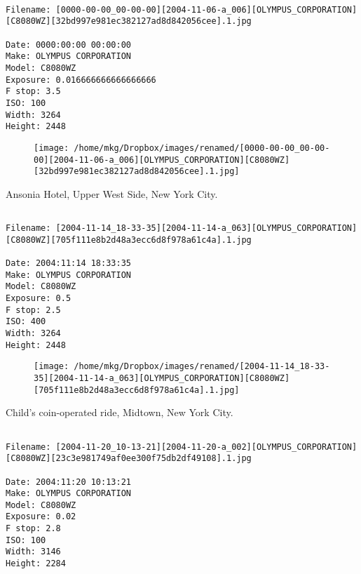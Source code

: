 \clearpage
\onecolumn
\noindent 
\noindent
\begin{lstlisting}

Filename: [0000-00-00_00-00-00][2004-11-06-a_006][OLYMPUS_CORPORATION][C8080WZ][32bd997e981ec382127ad8d842056cee].1.jpg

Date: 0000:00:00 00:00:00
Make: OLYMPUS CORPORATION
Model: C8080WZ
Exposure: 0.016666666666666666
F stop: 3.5
ISO: 100
Width: 3264
Height: 2448
\end{lstlisting}
\clearpage

\begin{figure}
\texttt{[image: /home/mkg/Dropbox/images/renamed/[0000-00-00\_00-00-00][2004-11-06-a\_006][OLYMPUS\_CORPORATION][C8080WZ][32bd997e981ec382127ad8d842056cee].1.jpg]}
\end{figure}
    
\clearpage
\onecolumn
\noindent Ansonia Hotel, Upper West Side, New York City.
\noindent
\begin{lstlisting}

Filename: [2004-11-14_18-33-35][2004-11-14-a_063][OLYMPUS_CORPORATION][C8080WZ][705f111e8b2d48a3ecc6d8f978a61c4a].1.jpg

Date: 2004:11:14 18:33:35
Make: OLYMPUS CORPORATION
Model: C8080WZ
Exposure: 0.5
F stop: 2.5
ISO: 400
Width: 3264
Height: 2448
\end{lstlisting}
\clearpage

\begin{figure}
\texttt{[image: /home/mkg/Dropbox/images/renamed/[2004-11-14\_18-33-35][2004-11-14-a\_063][OLYMPUS\_CORPORATION][C8080WZ][705f111e8b2d48a3ecc6d8f978a61c4a].1.jpg]}
\end{figure}
    
\clearpage
\onecolumn
\noindent Child's coin-operated ride, Midtown, New York City.
\noindent
\begin{lstlisting}

Filename: [2004-11-20_10-13-21][2004-11-20-a_002][OLYMPUS_CORPORATION][C8080WZ][23c3e981749af0ee300f75db2df49108].1.jpg

Date: 2004:11:20 10:13:21
Make: OLYMPUS CORPORATION
Model: C8080WZ
Exposure: 0.02
F stop: 2.8
ISO: 100
Width: 3146
Height: 2284
\end{lstlisting}
\clearpage

